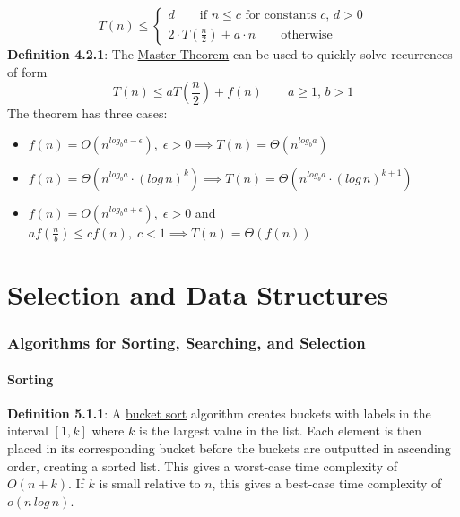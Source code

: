 \documentclass{article}
\newcommand{\definition}[2]{\textbf{Definition #1}: #2\label{def:#1}}
\begin{document}
\begin{equation}
    T(n) \leq 
    \begin{cases}
        d   \qquad \text{if } n \leq c \text{ for constants } c,\,d > 0 \\
        2 \cdot T(\frac{n}{2}) + a \cdot n  \qquad \text{otherwise}
    \end{cases}
\end{equation}
\definition{4.2.1}{The \underline{Master Theorem} can be used to quickly solve recurrences of form}
\begin{equation}
    T(n) \leq a T\left(\frac{n}{2}\right) + f(n) \quad\quad a \geq 1, \, b > 1
\end{equation}
The theorem has three cases:
\begin{itemize}
    \item \(f(n) = O(n^{log_b a - \epsilon}), \; \epsilon > 0 \implies T(n) = \Theta(n^{log_b a})\)
    \item \(f(n) = \Theta(n^{log_b a} \cdot (log \, n)^k) \implies T(n) = \Theta(n^{log_b a} \cdot (log \, n)^{k+1})\)
    \item \(f(n) = O(n^{log_b a + \epsilon}), \; \epsilon > 0\) and \(a f(\frac{n}{b}) \leq c f(n), \; c < 1 \implies T(n) = \Theta(f(n))\)
\end{itemize}

\newpage\part{Selection and Data Structures}\label{part:3.sds}

\section{Algorithms for Sorting, Searching, and Selection}

\subsection{Sorting}

\definition{5.1.1}{A \underline{bucket sort} algorithm creates buckets with labels in the interval \([1,k]\) where \(k\) is the largest value in the list. Each element is then placed in its corresponding bucket before the buckets are outputted in ascending order, creating a sorted list.}
This gives a worst-case time complexity of \(O(n+k)\). If \(k\) is small relative to \(n\), this gives a best-case time complexity of \(o(n \, log \, n)\). 
\end{document}
